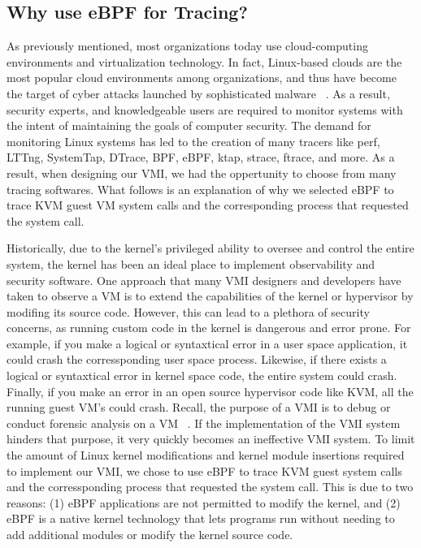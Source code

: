 \documentclass{report}
\begin{document}
\begin{spacing}{1.5}
\subsection{Why use eBPF for Tracing?}

{\large
As previously mentioned, most organizations today use cloud-computing environments and virtualization technology. In fact, Linux-based clouds are the most popular cloud environments among organizations, and thus have become the target of cyber attacks launched by sophisticated malware ~\cite{panker2021leveraging}. As a result, security experts, and knowledgeable users are required to monitor systems with the intent of maintaining the goals of computer security. The demand for monitoring Linux systems has led to the creation of many tracers like perf, LTTng, SystemTap, DTrace, BPF, eBPF, ktap, strace, ftrace, and more. As a result, when designing our VMI, we had the oppertunity to choose from many tracing softwares. What follows is an explanation of why we selected eBPF to trace KVM guest VM system calls and the corresponding process that requested the system call.
\newline
}

{\large
\noindent Historically, due to the kernel’s privileged ability to oversee and control the entire system, the kernel has been an ideal place to implement observability and security software. One approach that many VMI designers and developers have taken to observe a VM is to extend the capabilities of the kernel or hypervisor by modifing its source code. However, this can lead to a plethora of security concerns, as running custom code in the kernel is dangerous and error prone. For example, if you make a logical or syntaxtical error in a user space application, it could crash the corressponding user space process. Likewise, if there exists a logical or syntaxtical error in kernel space code, the entire system could crash. Finally, if you make an error in an open source hypervisor code like KVM, all the running guest VM's could crash. Recall, the purpose of a VMI is to debug or conduct forensic analysis on a VM ~\cite{Payne2011}. If the implementation of the VMI system hinders that purpose, it very quickly becomes an ineffective VMI system. To limit the amount of Linux kernel modifications and kernel module insertions required to implement our VMI, we chose to use eBPF to trace KVM guest system calls and the corressponding process that requested the system call. This is due to two reasons: (1) eBPF applications are not permitted to modify the kernel, and (2) eBPF is a native kernel technology that lets programs run without needing to add additional modules or modify the kernel source code.
\newline
}


\end{spacing}
\end{document}
